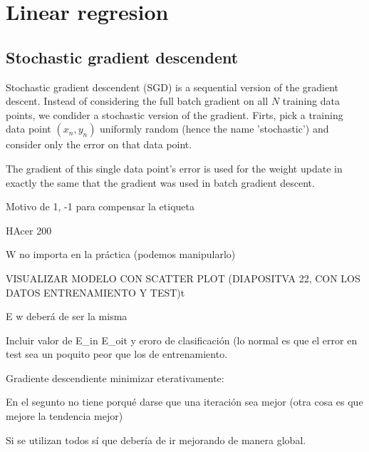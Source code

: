 
\section{ Linear regresion }
\subsection{Stochastic gradient descendent}


Stochastic gradient descendent (SGD) is a sequential version of the gradient descent. Instead of considering the full batch gradient on all $N$
training data points, we condider a stochastic version of the gradient. Firts, pick a training data point $(x_n, y_n)$ uniformly random
(hence the name 'stochastic') and consider only the error on that data point.

The gradient of this single data point's error is used for the weight update in exactly the same that the gradient was used in batch gradient descent.


Motivo de 1, -1 para compensar la etiqueta

HAcer 200

W no importa en la práctica (podemos manipularlo)

VISUALIZAR MODELO CON SCATTER PLOT (DIAPOSITVA 22, CON LOS DATOS ENTRENAMIENTO Y TEST)t

E w deberá de ser la misma

Incluir valor de E_in E_oit y eroro de clasificación (lo normal es que el error en test sea un poquito peor que los de entrenamiento.

Gradiente descendiente minimizar eterativamente:

En el segunto no tiene porqué darse que una iteración sea mejor (otra cosa es que mejore la tendencia mejor)

Si se utilizan todos sí que debería de ir mejorando de manera global. 